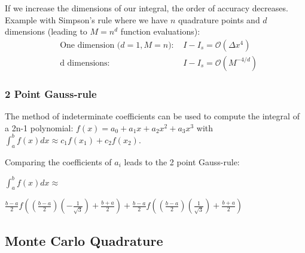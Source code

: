 \documentclass[8pt,a4paper]{scrartcl}
\begin{document}
\begin{multicols*}{3}
If we increase the dimensions of our integral, the order of accuracy decreases. Example with Simpson's rule where we have $n$ quadrature points and $d$ dimensions (leading to $M = n^d$ function evaluations):
\begin{align*}
&\text{One dimension ($d=1, M=n$): } & I -I_s = \mathcal{O}(\Delta x^4) \\
&\text{d dimensions: } & I - I_s = \mathcal{O}(M^{-4/d})
\end{align*}

\subsubsection{2 Point Gauss-rule}


The method of indeterminate coefficients can be used to compute the integral of a 2n-1 polynomial: $f(x)=a_0+a_1x+a_2x^2+a_3x^3$ with $\int_a^bf(x) dx\approx c_1f(x_1)+c_2f(x_2)$.

Comparing the coefficients of $a_i$ leads to the 2 point Gauss-rule:

$\int_a^b{f(x)}dx\approx$

$\frac{b-a}{2}f\left(\left(\frac{b-a}{2}\right)\left(-\frac{1}{\sqrt{3}}\right)+\frac{b+a}{2}\right)+\frac{b-a}{2}f\left(\left(\frac{b-a}{2}\right)\left(\frac{1}{\sqrt{3}}\right)+\frac{b+a}{2}\right)$

\subsection{Monte Carlo Quadrature}


\end{multicols*}
\end{document}
